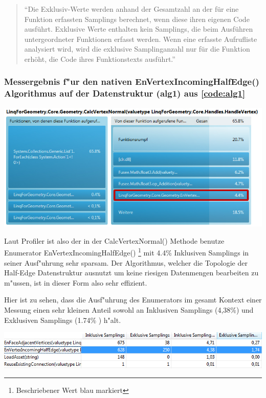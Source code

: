 \documentclass[pagesize, paper=a4, fontsize=12pt,titlepage=true, headings=small, headnosepline, abstractoff, liststotoc, nochapterprefix, plainheadsepline]{scrreprt}
\newcommand{\HES}{Half-Edge Datenstruktur }
\begin{document}
\begin{quote}"`Die Exklusiv-Werte werden anhand der Gesamtzahl an der f{\"u}r eine Funktion erfassten Samplings berechnet, wenn diese ihren eigenen Code ausf{\"u}hrt. Exklusive Werte enthalten kein Samplings, die beim Ausf{\"u}hren untergeordneter Funktionen erfasst werden. Wenn eine erfasste Aufrufliste analysiert wird, wird die exklusive Samplinganzahl nur f{\"u}r die Funktion erh{\"o}ht, die Code ihres Funktionstexts ausf{\"u}hrt."' \cite[Analyse von Leistungsdaten]{MicrosoftCReferenz.2013}\end{quote}


\subsubsection{Messergebnis f"ur den nativen EnVertexIncomingHalfEdge() Algorithmus auf der Datenstruktur (alg1) aus \ref{code:alg1}}
\begin{minipage}[c][8.5cm]{\linewidth}
\includegraphics[width=\linewidth]{../Messung/2-linq-calcvertnormals-0}
\label{messung:alg10}
\end{minipage}
Laut Profiler ist also der in der CalcVertexNormal() Methode benutze Enumerator EnVertexIncomingHalfEdge() \footnote{Beschriebener Wert blau markiert} mit 4.4\% Inklusiven Samplings in seiner Ausf"uhrung sehr sparsam. Der Algorithmus, welcher die Topologie der \HES ausnutzt um keine riesigen Datenmengen bearbeiten zu m"ussen, ist in dieser Form also sehr effizient.
\newline

Hier ist zu sehen, dass die Ausf"uhrung des Enumerators im gesamt Kontext einer Messung einen sehr kleinen Anteil sowohl an Inklusiven Samplings (4,38\%) und Exklusiven Samplings (1.74\% ) h"alt.
\begin{minipage}[c][7cm]{\linewidth}
\includegraphics[width=\linewidth]{../Messung/2-linq-envertexinche-0}
\label{messung:alg11}
\end{minipage}
\end{document}

